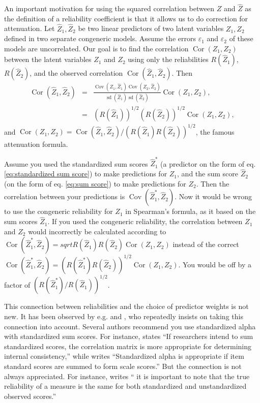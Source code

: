 \documentclass[twoside]{article}
\DeclareMathOperator{\sd}{sd}
\DeclareMathOperator{\Cor}{Cor}
\DeclareMathOperator{\Cov}{Cov}
\renewcommand{\sqrt}[1]{{(#1)^{1/2}}}
\begin{document}
An important motivation for using the squared
correlation between $Z$ and $\hat{Z}$ as the definition of a
reliability coefficient is that it allows us to do correction for
attenuation. Let $\hat{Z}_{1},\hat{Z}_{2}$ be two linear
predictors of two latent variables $Z_{1},Z_{2}$ defined in two separate
congeneric models. Assume the errors $\varepsilon_{1}$ and $\varepsilon_{2}$ of these models
are uncorrelated. Our goal is to find the correlation $\Cor(Z_{1},Z_{2})$
between the latent variables $Z_{1}$ and $Z_{2}$ using only the
reliabilities $ R(\hat{Z}_{1})$, $ R(\hat{Z}_{2})$,
and the observed correlation $\Cor(\hat{Z}_{1},\hat{Z}_{2})$.
Then
\begin{eqnarray*}
\Cor(\hat{Z}_{1},\hat{Z}_{2}) & = & \frac{\Cov(Z_{1},\hat{Z}_{1})\Cov(Z_{2},\hat{Z}_{2})}{\sd(\hat{Z}_{1})\sd(\hat{Z}_{2})}\Cor(Z_{1},Z_{2}),\\
 & = & \sqrt{ R(\hat{Z}_{1})}\sqrt{ R(\hat{Z}_{2})}\Cor(Z_{1},Z_{2}),
\end{eqnarray*}
and $\Cor(Z_{1},Z_{2})=\Cor(\hat{Z}_{1},\hat{Z}_{2})/\sqrt{ R(\hat{Z}_{1}) R(\hat{Z}_{2})}$,
the famous \citet{spearman1904proof} attenuation formula.


Assume you used the standardized sum scores $\hat{Z}_1^*$ (a predictor on the form of eq. \eqref{eq:standardized sum score}) to make predictions for $Z_1$, and the sum score $\hat{Z}_2$ (on the form of eq. \eqref{eq:sum score}) to make predictions for $Z_2$. Then the correlation between your predictions is $\Cov(\hat{Z}_1^*,\hat{Z}_2)$. Now it would be wrong to use the congeneric reliability for $Z_1$ in Spearman's formula, as it based on the sum scores $\hat{Z}_1$. If you used the congeneric reliability, the correlation between $Z_1$ and $Z_2$ would incorrectly be calculated according to $\Cor(\hat{Z}_{1}^*,\hat{Z}_{2})= sqrt{ R(\hat{Z}_{1}) R(\hat{Z}_{2})}\Cor(Z_{1},Z_{2})$
instead of the correct $\Cor(\hat{Z}_{1}^*,\hat{Z}_{2})=\sqrt{ R(\hat{Z}_{1}^{*}) R(\hat{Z}_{2})}\Cor(Z_{1},Z_{2})$.
You would be off by a factor of $\sqrt{ R(\hat{Z}_{1}^{*})/ R(\hat{Z}_{1})}$.

This connection between reliabilities and the choice of predictor
weights is not new. It has been observed by e.g. \citet[][p. 112]{Joreskog1971-nn} and \citet{McNeish2018-vu}, who repeatedly insists on taking this connection into account. Several authors recommend you use standardized alpha with standardized sum scores. For instance, \citet[][p. 451]{Falk2011-ae} states \enquote{If researchers intend to sum
standardized scores, the correlation matrix is more appropriate for determining internal consistency,} while \citet[][p. 99]{Cortina1993-aq} writes \enquote{Standardized alpha is appropriate if item standard scores are summed to form scale scores.} But the connection is not always appreciated. For instance, \citet[][p.348]{Osburn2000-jd} writes
\enquote{\textelp{} it is important to note that the true reliability of a measure is the same for both standardized and unstandardized observed scores.}
\end{document}
